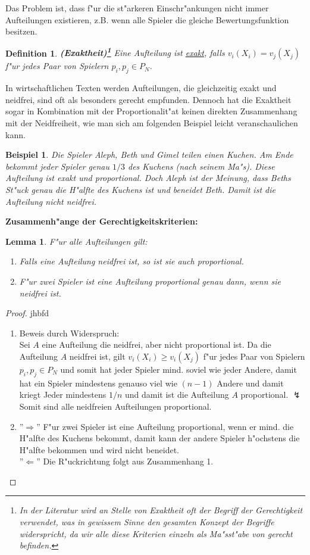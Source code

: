 \documentclass[11pt, a4paper, twoside]{article}
\newcommand{\wf}{\color{white}}
\newcommand{\tf}{\color{black}}
\newtheorem{defi}[satz]{Definition}
\newtheorem{bsp}[satz]{Beispiel}
\newtheorem{lem}[satz]{Lemma}
\numberwithin{equation}{section}
\begin{document}
Das Problem ist, dass f"ur die st"arkeren Einschr"ankungen nicht immer Aufteilungen existieren, z.B. wenn alle Spieler die gleiche Bewertungsfunktion besitzen. 
\begin{defi}{\textbf{(Exaktheit)\footnote{In der Literatur wird an Stelle von Exaktheit oft der Begriff der Gerechtigkeit verwendet, was in gewissem Sinne den gesamten Konzept der Begriffe widerspricht, da wir alle diese Kriterien einzeln als Ma"sst"abe von gerecht befinden.}}}
\newline Eine Aufteilung ist \underline{exakt}, falls $v_i(X_i) = v_j(X_j)$ f"ur jedes Paar von Spielern $p_i, p_j \in P_N$.
\end{defi}
In wirtschaftlichen Texten werden Aufteilungen, die gleichzeitig exakt und neidfrei, sind oft als besonders gerecht empfunden. Dennoch hat die Exaktheit sogar in Kombination mit der Proportionalit"at keinen direkten Zusammenhang mit der Neidfreiheit, wie man sich am folgenden Beispiel leicht veranschaulichen kann.\\
\begin{bsp}Die Spieler Aleph, Beth und Gimel teilen einen Kuchen. Am Ende bekommt jeder Spieler genau $1/3$ des Kuchens (nach seinem Ma"s). Diese Aufteilung ist exakt und proportional. Doch Aleph ist der Meinung, dass Beths St"uck genau die H"alfte des Kuchens ist und beneidet Beth. Damit ist die Aufteilung nicht neidfrei.\end{bsp}
\textbf{Zusammenh"ange der Gerechtigkeitskriterien:}
\begin{lem}
F"ur alle Aufteilungen gilt:
\begin{enumerate}
\item Falls eine Aufteilung neidfrei ist, so ist sie auch proportional.
\item F"ur zwei Spieler ist eine Aufteilung proportional genau dann, wenn sie neidfrei ist.
\end{enumerate}
\end{lem}
\begin{proof}\wf jhbfd \tf
\begin{enumerate}
\item Beweis durch Widerspruch:\\ Sei $A$ eine Aufteilung die neidfrei, aber nicht proportional ist. Da die Aufteilung $A$ neidfrei ist, gilt $v_i(X_i) \geq v_i(X_j)$ f"ur jedes Paar von Spielern $p_i, p_j \in P_N$ und somit hat jeder Spieler mind. soviel wie jeder Andere, damit hat ein Spieler mindestens genauso viel wie $(n-1)$ Andere und damit kriegt Jeder mindestens $1/n$ und damit ist die Aufteilung $A$ proportional. $\lightning$\\Somit sind alle neidfreien Aufteilungen proportional.
\item ''$\Rightarrow$'' F"ur zwei Spieler ist eine Aufteilung proportional, wenn er mind. die H"alfte des Kuchens bekommt, damit kann der andere Spieler h"ochstens die H"alfte bekommen und wird nicht beneidet.\\ ''$\Leftarrow$'' Die R"uckrichtung folgt aus Zusammenhang 1.\\
\end{enumerate}
\end{proof}
\end{document}
